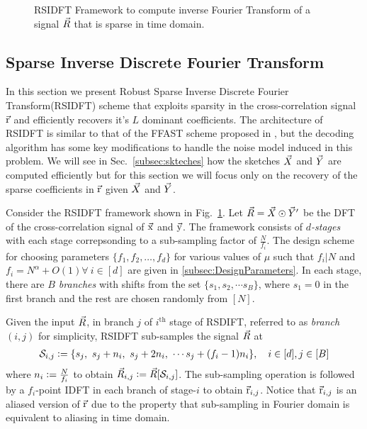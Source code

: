 	 \begin{figure}[t!]
	 	\begin{center}
	 	\resizebox{0.6\textwidth}{!}{}
	 	\end{center}	   
	 	\caption{ RSIDFT Framework to compute inverse Fourier Transform of a signal $\vec{R}$ that is sparse in time domain. }\label{fig:rsidft}
	\vspace{5 pt}
	 \end{figure}

\subsection{Sparse Inverse Discrete Fourier Transform}
\label{subsec:RSIDFT}	
 In this section we present Robust Sparse Inverse Discrete Fourier Transform(RSIDFT) scheme that exploits sparsity in the cross-correlation signal $\vec{\mathrm{r}}$ and efficiently recovers it's $L$ dominant coefficients. The architecture of RSIDFT is similar to that of the FFAST scheme proposed in \cite{pawar2014robust}, but the decoding algorithm has some key modifications to handle the noise model induced in this problem. We will see in Sec.~\ref{subsec:skteches} how the sketches $\vec{X}$ and $\vec{Y}$ are computed efficiently but for this section we will focus only on the recovery of the sparse coefficients in $\vec{\mathrm{r}}$ given $\vec{X}$ and $\vec{Y}$.
	  	  
Consider the RSIDFT framework shown in Fig.~\ref{fig:rsidft}. Let $ \vec{R} =\vec{X} \odot \vec{Y}'$ be the DFT of the cross-correlation signal of $\vec{\mathrm{x}}$ and $\vec{\mathrm{y}}$. The framework consists of {\it $d$-stages} with each stage correpsonding to a sub-sampling factor of $\frac{N}{f_i}$. The design scheme for choosing parameters $\{f_1,f_2,\ldots,f_d\}$ for various values of $\mu$ such that $f_i | N$ and $f_i=N^{\alpha}+O(1) \forall ~i\in[d]$ are given in \ref{subsec:DesignParameters}. In each stage, there are {\it $B$ branches} with shifts from the set $ \{s_1, s_2, \cdots s_B\} $, where $s_1 =0$ in the first branch and the rest are chosen randomly from $[N]$.
	   	 	
	 Given the input $\vec{R}$, in branch $j$ of $i^{\text{th}}$ stage of RSDIFT, referred to as \textit{branch $(i,j)$} for simplicity, RSIDFT sub-samples the signal $\vec{R}$ at
\begin{align}
\label{Eqn:SamplingSets}
	 \mathcal{S}_{i,j} \mathrel{\mathop:}= \{s_j,\ s_j + n_i,\ s_j + 2n_i,\ \cdots s_j + (f_i-1) n_i\}, \quad i\in[d], j\in[B]
\end{align}
where $n_i\mathrel{\mathop:}= \frac{N}{f_i}$ to obtain $\vec{R}_{i,j}\mathrel{\mathop:}=\vec{R}[\mathcal{S}_{i,j}]$. The sub-sampling operation is followed by a $f_i$-point IDFT in each branch of stage-$i$ to obtain $ \vec{\mathrm{r}}_{i,j}$. Notice that $ \vec{\mathrm{r}}_{i,j}$ is an aliased version of $\vec{\mathrm{r}}$ due to the property that sub-sampling in Fourier domain is equivalent to aliasing in time domain.

